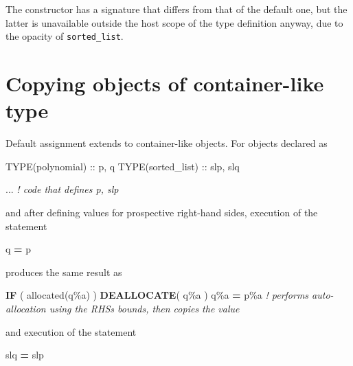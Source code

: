 \documentclass[]{scrartcl}
\newenvironment{Shaded}{}{}
\newcommand{\CommentTok}[1]{\textcolor[rgb]{0.38,0.63,0.69}{\textit{#1}}}
\newcommand{\DataTypeTok}[1]{\textcolor[rgb]{0.56,0.13,0.00}{#1}}
\newcommand{\FunctionTok}[1]{\textcolor[rgb]{0.02,0.16,0.49}{#1}}
\newcommand{\KeywordTok}[1]{\textcolor[rgb]{0.00,0.44,0.13}{\textbf{#1}}}
\newcommand{\NormalTok}[1]{#1}
\newcommand{\OperatorTok}[1]{\textcolor[rgb]{0.40,0.40,0.40}{#1}}
\begin{document}
The constructor has a signature that differs from that of the default
one, but the latter is unavailable outside the host scope of the type
definition anyway, due to the opacity of \texttt{sorted\_list}.

\section{Copying objects of container-like
type}\label{copying-objects-of-container-like-type}

Default assignment extends to container-like objects. For objects
declared as

\begin{Shaded}
\begin{Highlighting}[]
\DataTypeTok{TYPE(polynomial)} \DataTypeTok{::}\NormalTok{ p, q}
\DataTypeTok{TYPE(sorted\_list)} \DataTypeTok{::}\NormalTok{ slp, slq}

\NormalTok{... }\CommentTok{! code that defines p, slp}
\end{Highlighting}
\end{Shaded}

and after defining values for prospective right-hand sides, execution of
the statement

\begin{Shaded}
\begin{Highlighting}[]
\NormalTok{q }\KeywordTok{=}\NormalTok{ p}
\end{Highlighting}
\end{Shaded}

produces the same result as

\begin{Shaded}
\begin{Highlighting}[]
\KeywordTok{IF}\NormalTok{ ( }\FunctionTok{allocated}\NormalTok{(q}\OperatorTok{\%}\NormalTok{a) ) }\KeywordTok{DEALLOCATE}\NormalTok{( q}\OperatorTok{\%}\NormalTok{a )}
\NormalTok{q}\OperatorTok{\%}\NormalTok{a }\KeywordTok{=}\NormalTok{ p}\OperatorTok{\%}\NormalTok{a  }\CommentTok{! performs auto{-}allocation using the RHS\textquotesingle{}s bounds, then copies the value}
\end{Highlighting}
\end{Shaded}

and execution of the statement

\begin{Shaded}
\begin{Highlighting}[]
\NormalTok{slq }\KeywordTok{=}\NormalTok{ slp}
\end{Highlighting}
\end{Shaded}
\end{document}
